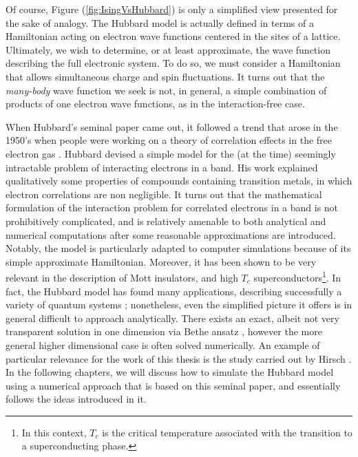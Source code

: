 Of course, Figure (\ref{fig:IsingVsHubbard}) is only a simplified view presented for the sake of analogy. The Hubbard model is actually defined in terms of a Hamiltonian acting on electron wave functions centered in the sites of a lattice. Ultimately, we wish to determine, or at least approximate, the wave function describing the full electronic system. To do so, we must consider a Hamiltonian that allows simultaneous charge and spin fluctuations. It turns out that the \emph{many-body} wave function we seek is not, in general, a simple combination of products of one electron wave functions, as in the interaction-free case.

When Hubbard's seminal paper came out, it followed a trend that arose in the 1950's when people were working on a theory of correlation effects in the free electron gas \cite{Bohm1953, Gell-Mann1957, Sawada1957, Hubbard1957, Hubbard1958, Nozieres1958}. Hubbard devised a simple model for the (at the time) seemingly intractable problem of interacting electrons in a band. His work explained qualitatively some properties of compounds containing transition metals, in which electron correlations are non negligible. It turns out that the mathematical formulation of the interaction problem for correlated electrons in a band is not prohibitively complicated, and is relatively amenable to both analytical and numerical computations after some reasonable approximations are introduced. Notably, the model is particularly adapted to computer simulations because of its simple approximate Hamiltonian. Moreover, it has been shown to be very relevant in the description of Mott insulators, and high $T_c$  superconductors\footnote{In this context, $T_c$ is the critical temperature associated with the transition to a superconducting phase.}. In fact, the Hubbard model has found many applications, describing successfully a variety of quantum systems \cite{Editorial2013}; nonetheless, even the simplified picture it offers is in general difficult to approach analytically. There exists an exact, albeit not very transparent solution in one dimension via Bethe ansatz \cite{Lieb1968}, however the more general higher dimensional case is often solved numerically.  An example of particular relevance for the work of this thesis is the study carried out by Hirsch \cite{Hirsch1985}. In the following chapters, we will discuss how to simulate the Hubbard model using a numerical approach that is based on this seminal paper, and essentially follows the ideas introduced in it.

